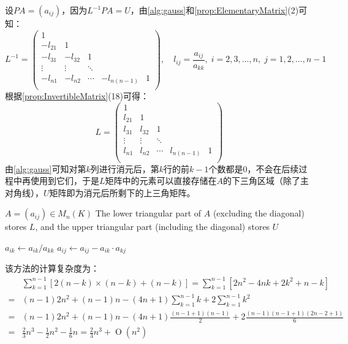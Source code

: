 \begin{method}
	设$PA=(a_{ij})$，因为$L^{-1}PA=U$，由\cref{alg:gauss}和\cref{prop:ElementaryMatrix}(2)可知：
	\begin{equation*}
		L^{-1}=
		\begin{pmatrix}
			1 & & & &  \\
			-l_{21} & 1 & & &  \\
			-l_{31}& -l_{32} & 1 & &  \\
			\vdots & \vdots & \ddots &  &  \\
			-l_{n1} & -l_{n2} & \cdots &-l_{n(n-1)} & 1 \\
		\end{pmatrix},\quad
		l_{ij}=\frac{a_{ij}}{a_{kk}},\;i=2,3,\dots,n,\;j=1,2,\dots,n-1
	\end{equation*}
	根据\cref{prop:InvertibleMatrix}(18)可得：
	\begin{equation*}
		L=
		\begin{pmatrix}
			1 & & & &  \\
			l_{21} & 1 & & &  \\
			l_{31}& l_{32} & 1 & &  \\
			\vdots & \vdots & \ddots &  &  \\
			l_{n1} & l_{n2} & \cdots & l_{n(n-1)} & 1 \\
		\end{pmatrix}
	\end{equation*}
	由\cref{alg:gauss}可知对第$k$列进行消元后，第$k$行的前$k-1$个数都是$0$，不会在后续过程中再使用到它们，于是$L$矩阵中的元素可以直接存储在$A$的下三角区域（除了主对角线），$U$矩阵即为消元后所剩下的上三角矩阵。
	\begin{algorithm}[H]
		\caption{In-place LU Factorization (without pivoting)}
		\label{alg:LUFactorization}
		\begin{algorithmic}[1]
			\Require $A=(a_{ij})\in M_{n}(K)$
			\Ensure The lower triangular part of $A$ (excluding the diagonal) stores $L$,
			and the upper triangular part (including the diagonal) stores $U$
			
					\State $a_{ik} \gets a_{ik} / a_{kk}$ 
						\State $a_{ij} \gets a_{ij} - a_{ik} \cdot a_{kj}$
					\EndFor
				\EndFor
			\EndFor
		\end{algorithmic}
	\end{algorithm}
	该方法的计算复杂度为：
	\begin{align*}
		&\sum_{k=1}^{n-1}[2(n-k)\times(n-k)+(n-k)]=\sum_{k=1}^{n-1}[2n^2-4nk+2k^2+n-k] \\
		=&(n-1)2n^2+(n-1)n-(4n+1)\sum_{k=1}^{n-1}k+2\sum_{k=1}^{n-1}k^2 \\
		=&(n-1)2n^2+(n-1)n-(4n+1)\frac{(n-1+1)(n-1)}{2}+2\frac{(n-1)(n-1+1)(2n-2+1)}{6} \\
		=&\frac{2}{3}n^3-\frac{1}{2}n^2-\frac{1}{6}n=\frac{2}{3}n^3+\operatorname{O}(n^2)
	\end{align*}
\end{method}
